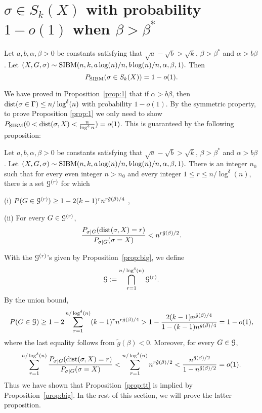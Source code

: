 \documentclass{article}
\begin{document}
\section{$\sigma \in S_k(X)$ with probability $1-o(1)$ when $\beta>\beta^\ast$} \label{sect:equal}
\begin{proposition} \label{prop:tt}
Let $a,b,\alpha,\beta> 0$ be constants satisfying that $\sqrt{a}-\sqrt{b} > \sqrt{k}$, $\beta>\beta^\ast$ and $\alpha>b\beta$. 
Let 
$
(X,G,\sigma) \sim \operatorname{SIBM}(n,k, a\log(n)/n, b\log(n)/n,\alpha,\beta, 1) .
$
Then
$$
P_{\operatorname{SIBM}}(\sigma \in S_k(X))=1-o(1) .
$$
\end{proposition}
We have proved in Proposition~\ref{prop:1} that if $\alpha>b\beta$, then $\operatorname{dist}(\sigma \in \Gamma) \le n/\log^{\delta}(n)$
with probability $1-o(1)$. By the symmetric property, to prove Proposition \ref{prop:1}
we only need to show $P_{\operatorname{SIBM}}( 0 <\operatorname{dist}(\sigma, X) < \frac{n}{\log^{\delta} n})=o(1) $.
This is guaranteed by the following proposition:
\begin{proposition} \label{prop:big}
Let $a,b,\alpha,\beta> 0$ be constants satisfying that $\sqrt{a}-\sqrt{b} > \sqrt{k}$, $\beta>\beta^\ast$ and $\alpha>b\beta$. 
Let 
$
(X,G,\sigma) \sim \operatorname{SIBM}(n,k,a\log(n)/n, b\log(n)/n,\alpha,\beta, 1) .
$
There is an integer $n_0$ such that for every even integer $n>n_0$ and  every integer $1\le r \le n/\log^{\delta}(n)$,
there is a set $\mathcal{G}^{(r)}$ for which

\noindent (i)
$P(G\in\mathcal{G}^{(r)}) \ge 1- 2(k-1)^r n^{r\tilde{g}(\beta)/4}$ ,

\noindent (ii) For every $G\in\mathcal{G}^{(r)}$,
$$
\frac{P_{\sigma|G}(\operatorname{dist}(\sigma, X)=r)}
{P_{\sigma|G}(\sigma=X)} <
n^{r \tilde{g}(\beta) /2} .
$$
\end{proposition}
With the $\mathcal{G}^{(r)}$'s given by Proposition~\ref{prop:big}, we
define 
$$
\mathcal{G}:=\bigcap_{r=1}^{n/\log^{\delta}(n)} \mathcal{G}^{(r)} .
$$
By the union bound,
$$
P(G\in\mathcal{G})\ge 1-2 \sum_{r=1}^{n/\log^{\delta}(n)} (k-1)^rn^{r\tilde{g}(\beta)/4}
> 1- \frac{2 (k-1)n^{\tilde{g}(\beta)/4}}{1-(k-1)n^{\tilde{g}(\beta)/4}}
=1-o(1),
$$
where the last equality follows from $\tilde{g}(\beta)<0$. Moreover, for every $G\in\mathcal{G}$,
\begin{align*}
\sum_{r=1}^{n/\log^{\delta}(n)}
\frac{P_{\sigma|G}(\operatorname{dist}(\sigma, X) = r )}
{P_{\sigma|G}(\sigma=X)}
< \sum_{r=1}^{n/\log^{\delta}(n)}
n^{r \tilde{g}(\beta) /2}
< \frac{n^{\tilde{g}(\beta)/2}}{1-n^{\tilde{g}(\beta)/2}} =o(1) .
\end{align*}
Thus we have shown that Proposition~\ref{prop:tt} is implied by Proposition~\ref{prop:big}. In the rest of this section, we will prove the latter proposition.
\end{document}
